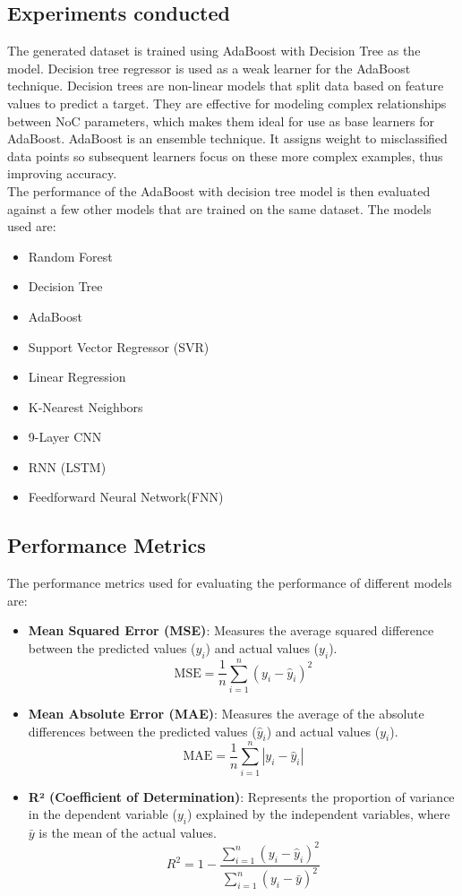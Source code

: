 \documentclass[conference]{IEEEtran}
\begin{document}
	\subsection{Experiments conducted}
	The generated dataset is trained using AdaBoost with Decision Tree as the model. Decision tree regressor is used as a weak learner for the AdaBoost technique. Decision trees are non-linear models that split data based on feature values to predict a target. They are effective for modeling complex relationships between NoC parameters, which makes them ideal for use as base learners for AdaBoost. AdaBoost is an ensemble technique. It assigns weight to misclassified data points so subsequent learners focus on these more complex examples, thus improving accuracy. \\
	The performance of the AdaBoost with decision tree model is then evaluated against a few other models that are trained on the same dataset. The models used are:
	\begin{itemize}
		\item Random Forest
		\item Decision Tree
		\item AdaBoost
		\item Support Vector Regressor (SVR)
		\item Linear Regression
		\item K-Nearest Neighbors
		\item 9-Layer CNN
		\item RNN (LSTM)
		\item Feedforward Neural Network(FNN)
	\end{itemize}
	

	\subsection{Performance Metrics}
	The performance metrics used for evaluating the performance of different models are:	
	\begin{itemize}
		\item \textbf{Mean Squared Error (MSE)}: Measures the average squared difference between the predicted values (\( \hat{y}_i \)) and actual values (\( y_i \)).
		\[
		\text{MSE} = \frac{1}{n} \sum_{i=1}^n \left( y_i - \hat{y}_i \right)^2
		\]
		
		\item \textbf{Mean Absolute Error (MAE)}: Measures the average of the absolute differences between the predicted values (\( \hat{y}_i \)) and actual values (\( y_i \)).
		\[
		\text{MAE} = \frac{1}{n} \sum_{i=1}^n \left| y_i - \hat{y}_i \right|
		\]
		
		\item \textbf{R² (Coefficient of Determination)}: Represents the proportion of variance in the dependent variable (\( y_i \)) explained by the independent variables, where \( \bar{y} \) is the mean of the actual values.
		\[
		R^2 = 1 - \frac{\sum_{i=1}^n \left( y_i - \hat{y}_i \right)^2}{\sum_{i=1}^n \left( y_i - \bar{y} \right)^2}
		\] 
	\end{itemize} 
	
\end{document}
